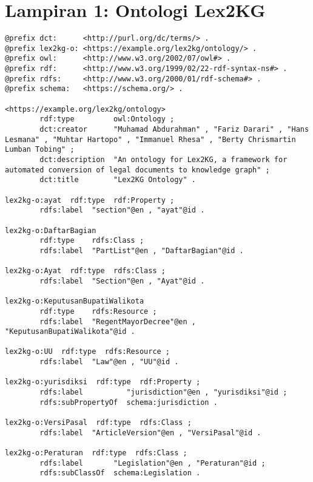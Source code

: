 \chapter*{Lampiran 1: Ontologi Lex2KG}
\label{appendix:ontologi}

\begin{lstlisting}
@prefix dct:      <http://purl.org/dc/terms/> .
@prefix lex2kg-o: <https://example.org/lex2kg/ontology/> .
@prefix owl:      <http://www.w3.org/2002/07/owl#> .
@prefix rdf:      <http://www.w3.org/1999/02/22-rdf-syntax-ns#> .
@prefix rdfs:     <http://www.w3.org/2000/01/rdf-schema#> .
@prefix schema:   <https://schema.org/> .

<https://example.org/lex2kg/ontology>
        rdf:type         owl:Ontology ;
        dct:creator      "Muhamad Abdurahman" , "Fariz Darari" , "Hans Lesmana" , "Muhtar Hartopo" , "Immanuel Rhesa" , "Berty Chrismartin Lumban Tobing" ;
        dct:description  "An ontology for Lex2KG, a framework for automated conversion of legal documents to knowledge graph" ;
        dct:title        "Lex2KG Ontology" .

lex2kg-o:ayat  rdf:type  rdf:Property ;
        rdfs:label  "section"@en , "ayat"@id .

lex2kg-o:DaftarBagian
        rdf:type    rdfs:Class ;
        rdfs:label  "PartList"@en , "DaftarBagian"@id .

lex2kg-o:Ayat  rdf:type  rdfs:Class ;
        rdfs:label  "Section"@en , "Ayat"@id .

lex2kg-o:KeputusanBupatiWalikota
        rdf:type    rdfs:Resource ;
        rdfs:label  "RegentMayorDecree"@en , "KeputusanBupatiWalikota"@id .

lex2kg-o:UU  rdf:type  rdfs:Resource ;
        rdfs:label  "Law"@en , "UU"@id .

lex2kg-o:yurisdiksi  rdf:type  rdf:Property ;
        rdfs:label          "jurisdiction"@en , "yurisdiksi"@id ;
        rdfs:subPropertyOf  schema:jurisdiction .

lex2kg-o:VersiPasal  rdf:type  rdfs:Class ;
        rdfs:label  "ArticleVersion"@en , "VersiPasal"@id .

lex2kg-o:Peraturan  rdf:type  rdfs:Class ;
        rdfs:label       "Legislation"@en , "Peraturan"@id ;
        rdfs:subClassOf  schema:Legislation .


\end{lstlisting}
